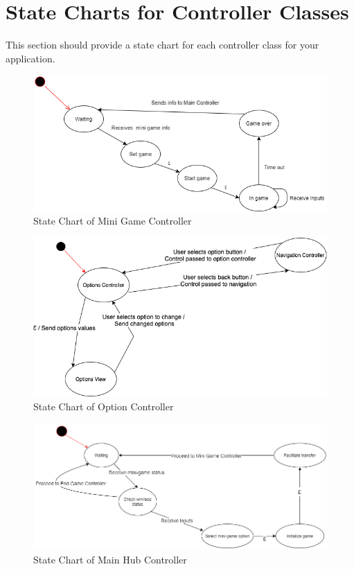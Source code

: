 \documentclass[]{article}
\begin{document}
\newpage
\section{State Charts for Controller Classes}
\label{sec:state_charts_for_controller_classes}
This section should provide a state chart for each controller class for your application.
\begin{figure}[h]
    \centering
    \includegraphics[width=\textwidth]{stateCharts/minigameSC.png}
    \caption{State Chart of Mini Game Controller}
\end{figure}

\begin{figure}[H]
    \centering
    \includegraphics[width=\textwidth]{stateCharts/options_controller.png}
    \caption{State Chart of Option Controller}
\end{figure}

\begin{figure}[H]
    \centering
    \includegraphics[width=1.0\textwidth]{stateCharts/mainhub_controller.png}
    \caption{State Chart of Main Hub Controller}
\end{figure}
\end{document}
